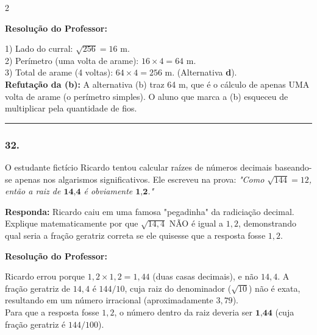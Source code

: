 \begin{multicols*}{2}
\ifgabarito
    \begin{tcolorbox}[colback=CorTitUm!5, colframe=CorTitUm, boxrule=1pt, arc=4pt, left=6pt, right=6pt, top=6pt, bottom=6pt]
    \small\textbf{\textcolor{CorTitUm}{Resolução do Professor:}}\par\vspace{0.1cm}
    \color{CinzaEscuro}
    1) Lado do curral: $ \sqrt{256} = 16 $ m.\\
    2) Perímetro (uma volta de arame): $ 16 \times 4 = 64 $ m.\\
    3) Total de arame (4 voltas): $ 64 \times 4 = 256 $ m. (Alternativa \textbf{d}).\\
    \textbf{Refutação da (b):} A alternativa (b) traz 64 m, que é o cálculo de apenas UMA volta de arame (o perímetro simples). O aluno que marca a (b) esqueceu de multiplicar pela quantidade de fios.
    \end{tcolorbox}
\fi

\par\vspace{\espacoQuestao}

\noindent\textcolor{CorLinha}{\rule{\linewidth}{0.5pt}} 
\par\vspace{\espacoPreQuestao}
\subsubsection*{32.} O estudante fictício Ricardo tentou calcular raízes de números decimais baseando-se apenas nos algarismos significativos. Ele escreveu na prova: 
\textit{"Como $ \sqrt{144} = 12 $, então a raiz de $ \textbf{14,4} $ é obviamente $ \textbf{1,2} $."}
\begin{boxresponda}
\textbf{Responda:} Ricardo caiu em uma famosa "pegadinha" da radiciação decimal. Explique matematicamente por que $ \sqrt{14,4} $ NÃO é igual a $ 1,2 $, demonstrando qual seria a fração geratriz correta se ele quisesse que a resposta fosse $ 1,2 $.
\end{boxresponda}

\ifgabarito
    \begin{tcolorbox}[colback=CorTitUm!5, colframe=CorTitUm, boxrule=1pt, arc=4pt, left=6pt, right=6pt, top=6pt, bottom=6pt]
    \small\textbf{\textcolor{CorTitUm}{Resolução do Professor:}}\par\vspace{0.1cm}
    \color{CinzaEscuro}
    Ricardo errou porque $ 1,2 \times 1,2 = 1,44 $ (duas casas decimais), e não $ 14,4 $. A fração geratriz de $ 14,4 $ é $ 144/10 $, cuja raiz do denominador ($\sqrt{10}$) não é exata, resultando em um número irracional (aproximadamente $ 3,79 $).\\
    Para que a resposta fosse $ 1,2 $, o número dentro da raiz deveria ser $ \textbf{1,44} $ (cuja fração geratriz é $ 144/100 $).
    \end{tcolorbox}
\fi


\end{multicols*}
